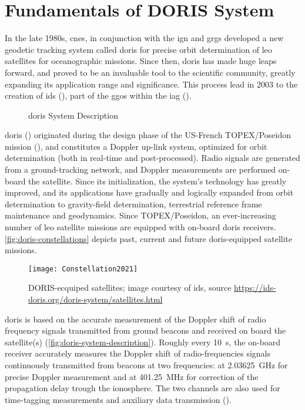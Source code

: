 \section{Fundamentals of DORIS System}\label{sec:doris-system-fundamentals}
In the late 1980s, \gls{cnes}, in conjunction with the \gls{ign} and \gls{grgs} developed 
a new geodetic tracking system called \gls{doris} for precise orbit determination 
of \gls{leo} satellites for oceanographic missions. Since then, \gls{doris} has 
made huge leaps forward, and proved to be an invaluable tool to the scientific community, 
greatly expanding its application range and significance. This process lead in 
2003 to the creation of \gls{ids} (\cite{Willis2016a}), part of the \gls{ggos} 
within the \gls{iag} (\cite{Willis2006}). 

\begin{figure}
  \centering
  
  \caption{\gls{doris} System Description}
  \label{fig:doris-system-description}
\end{figure}

\gls{doris} (\cite{Barlier2005}) originated during the design phase of the US-French 
TOPEX/Poseidon mission (\cite{Fu1994}), 
and constitutes a Doppler up-link system, optimized for orbit determination (both 
in real-time and post-processed). Radio signals are generated from a ground-tracking 
network, and Doppler measurements are performed on-board the satellite. Since its 
initialization, the system's technology has greatly improved, and its applications 
have gradually and logically expanded from orbit determination to gravity-field 
determination, terrestrial reference frame maintenance and geodynamics. Since TOPEX/Poseidon, an 
ever-increasing number of \gls{leo} satellite missions are equipped with on-board 
\gls{doris} receivers. \autoref{fig:doris-constellations} depicts past, current and 
future \gls{doris}-equipped satellite missions.

\begin{figure}[h!]
  \centering
  \texttt{[image: Constellation2021]}
  \caption{DORIS-ecquiped satellites; image courtesy of \gls{ids}, source \url{https://ids-doris.org/doris-system/satellites.html}}
  \label{fig:doris-constellations}
\end{figure}

\gls{doris} is based on the accurate measurement of the Doppler shift of radio 
frequency signals transmitted from ground beacons and received on board the 
satellite(s) (\autoref{fig:doris-system-description}). Roughly every \SI{10}{\second}, 
the on-board receiver accurately measures 
the Doppler shift of radio-frequencies signals continuously transmitted from 
beacons at two frequencies: at \SI{2.03625}{\GHz} for precise Doppler measurement 
and at \SI{401.25}{\MHz} for correction of the propagation delay trough the 
ionosphere. The two channels are also used for time-tagging measurements and 
auxiliary data transmission (\cite{Auriol2010}).

